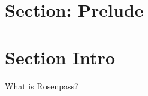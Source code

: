 \hypertarget{section-prelude}{%
\section{Section: Prelude}\label{section-prelude}}

\hypertarget{section-intro}{%
\section{Section Intro}\label{section-intro}}

\begin{frame}{What is Rosenpass?}
\hypertarget{rosenpass-history}{}



\end{frame}
